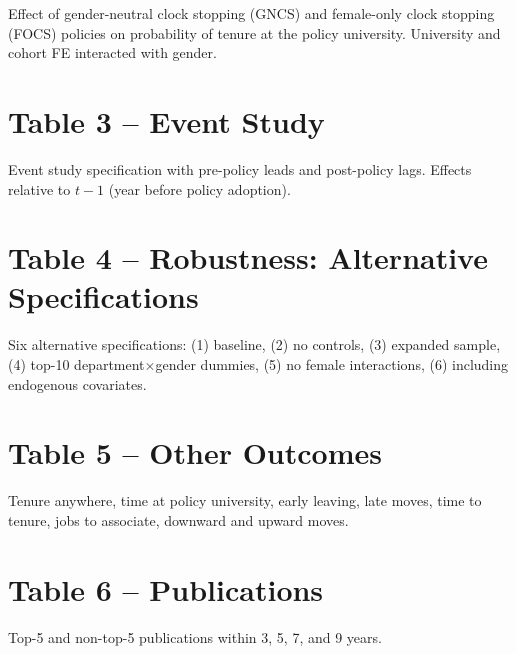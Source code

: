 \documentclass[12pt]{article}
\begin{document}
Effect of gender-neutral clock stopping (GNCS) and female-only clock stopping
(FOCS) policies on probability of tenure at the policy university.
University and cohort FE interacted with gender.

\vspace{1em}


\clearpage
\section{Table 3 -- Event Study}

Event study specification with pre-policy leads and post-policy lags.
Effects relative to $t-1$ (year before policy adoption).

\vspace{1em}


\clearpage
\section{Table 4 -- Robustness: Alternative Specifications}

Six alternative specifications: (1) baseline, (2) no controls,
(3) expanded sample, (4) top-10 department$\times$gender dummies,
(5) no female interactions, (6) including endogenous covariates.

\vspace{1em}


\clearpage
\section{Table 5 -- Other Outcomes}

Tenure anywhere, time at policy university, early leaving, late moves,
time to tenure, jobs to associate, downward and upward moves.

\vspace{1em}


\clearpage
\section{Table 6 -- Publications}

Top-5 and non-top-5 publications within 3, 5, 7, and 9 years.
\end{document}
